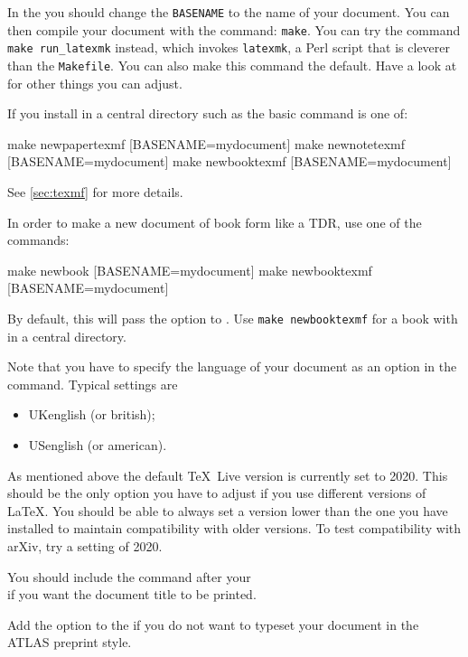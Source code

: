 In the  you should change the \texttt{BASENAME} to the name of your document.
You can then compile your document with the command: \texttt{make}.
You can try the command \texttt{make run\_latexmk} instead,
which invokes \texttt{latexmk}, a Perl script that is cleverer than the \texttt{Makefile}.
You can also make this command the default.
Have a look at  for other things you can adjust.

If you install  in a central directory such as  the basic command is one of:
%
\begin{bashlisting}
make newpapertexmf [BASENAME=mydocument]
make newnotetexmf [BASENAME=mydocument]
make newbooktexmf [BASENAME=mydocument]
\end{bashlisting}
%
See \cref{sec:texmf} for more details.

In order to make a new document of book form like a TDR, use one of the commands:
%
\begin{bashlisting}
make newbook [BASENAME=mydocument]
make newbooktexmf [BASENAME=mydocument]
\end{bashlisting}
%
By default, this will pass the option  to .
Use \verb|make newbooktexmf| for a book with  in a central directory.

Note that you have to specify the language of your document as an option in the
 command. Typical settings are
\begin{itemize}
\item UKenglish (or british);
\item USenglish (or american).
\end{itemize}

As mentioned above the default \TeX\ Live version is currently set to 2020.
This should be the only option you have to adjust if you use different versions of \LaTeX.
You should be able to always set a version lower than the one you have installed to maintain compatibility with older versions.
To test compatibility with arXiv, try a setting of 2020.

 You should include the command  after your\\
\verb|| if you want the document title to be printed.

Add the option  to the  if you do not want to typeset your document in the ATLAS preprint style.

